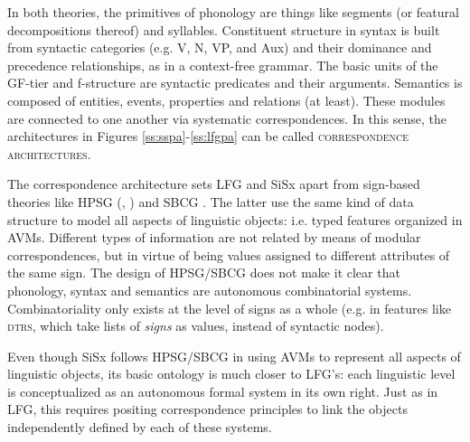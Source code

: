 \documentclass[output=paper,hidelinks]{langscibook}
\begin{document}
In both theories, the primitives of phonology are things like segments (or featural decompositions thereof) and syllables. Constituent structure in syntax is built from syntactic categories (e.g. V, N, VP, and Aux) and their dominance and precedence relationships, as in a context-free grammar. The basic units of the GF-tier and f-structure are syntactic predicates and their arguments. Semantics is composed of entities, events, properties and relations (at least). These modules are connected to one another via systematic correspondences. In this sense, the architectures in Figures \ref{ss:sspa}-\ref{ss:lfgpa} can be called \textsc{correspondence architectures}.


The correspondence architecture sets LFG and SiSx apart from sign-based theories like HPSG (\citealt{pollard1994head-driven}, ) and SBCG \citep{sag2012sign-based}. The latter use the same kind of data structure to model all aspects of linguistic objects: i.e. typed features organized in AVMs. Different types of information are not related by means of modular correspondences, but in virtue of being values assigned to different attributes of the same sign. The design of HPSG/SBCG does not make it clear that phonology, syntax and semantics are autonomous combinatorial systems. Combinatoriality only exists at the level of signs as a whole (e.g. in features like \textsc{dtrs}, which take lists of \textit{signs} as values, instead of syntactic nodes).

Even though SiSx follows HPSG/SBCG in using AVMs to represent all aspects of linguistic objects, its basic ontology is much closer to  LFG's: each linguistic level is conceptualized as an autonomous formal system in its own right. Just as in LFG, this requires positing correspondence principles to link the objects independently defined by each of these systems.
\end{document}
